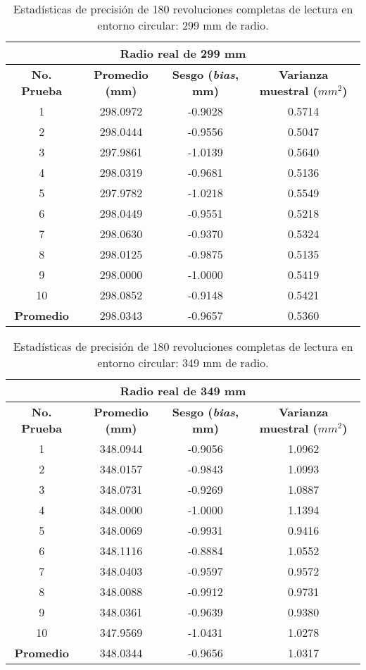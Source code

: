 \begin{table}[H]
	\centering
	\begin{tabular}{|c|c|c|c|}
		\hline
		\multicolumn{4}{|c|}{\textbf{Radio real de 299 mm}} \\ \hline
		\textbf{No. Prueba} & \textbf{Promedio (mm)} & \textbf{Sesgo (\textit{bias}, mm)} & \textbf{Varianza muestral ($mm^2$)} \\ \hline
		1 & 298.0972 & -0.9028 & 0.5714 \\ 
		2 & 298.0444 & -0.9556 & 0.5047 \\ 
		3 & 297.9861 & -1.0139 & 0.5640 \\ 
		4 & 298.0319 & -0.9681 & 0.5136 \\ 
		5 & 297.9782 & -1.0218 & 0.5549 \\ 
		6 & 298.0449 & -0.9551 & 0.5218 \\ 
		7 & 298.0630 & -0.9370 & 0.5324 \\ 
		8 & 298.0125 & -0.9875 & 0.5135 \\ 
		9 & 298.0000 & -1.0000 & 0.5419 \\ 
		10 & 298.0852 & -0.9148 & 0.5421 \\ \hline
		\textbf{Promedio} & 298.0343 & -0.9657 & 0.5360 \\ \hline
	\end{tabular}
	\caption{Estadísticas de precisión de 180 revoluciones completas de lectura en entorno circular: 299 mm de radio.}
	\label{fig:tabla_dists4}
\end{table}

\begin{table}[H]
	\centering
	\begin{tabular}{|c|c|c|c|}
		\hline
		\multicolumn{4}{|c|}{\textbf{Radio real de 349 mm}} \\ \hline
		\textbf{No. Prueba} & \textbf{Promedio (mm)} & \textbf{Sesgo (\textit{bias}, mm)} & \textbf{Varianza muestral ($mm^2$)} \\ \hline
		1 & 348.0944 & -0.9056 & 1.0962 \\ 
		2 & 348.0157 & -0.9843 & 1.0993 \\ 
		3 & 348.0731 & -0.9269 & 1.0887 \\ 
		4 & 348.0000 & -1.0000 & 1.1394 \\ 
		5 & 348.0069 & -0.9931 & 0.9416 \\ 
		6 & 348.1116 & -0.8884 & 1.0552 \\ 
		7 & 348.0403 & -0.9597 & 0.9572 \\ 
		8 & 348.0088 & -0.9912 & 0.9731 \\ 
		9 & 348.0361 & -0.9639 & 0.9380 \\ 
		10 & 347.9569 & -1.0431 & 1.0278 \\ \hline
		\textbf{Promedio} & 348.0344 & -0.9656 & 1.0317 \\ \hline
	\end{tabular}
	\caption{Estadísticas de precisión de 180 revoluciones completas de lectura en entorno circular: 349 mm de radio.}
	\label{fig:tabla_dists5}
\end{table}

